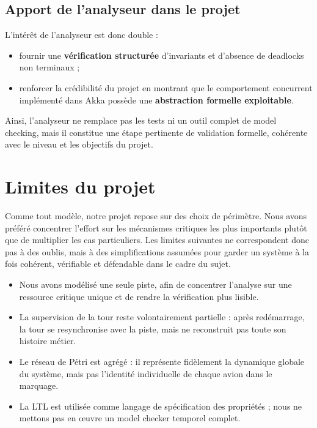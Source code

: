 \documentclass[11pt,a4paper]{article}
\begin{document}
\subsection{Apport de l'analyseur dans le projet}

L'intérêt de l'analyseur est donc double :
\begin{itemize}
    \item fournir une \textbf{vérification structurée} d'invariants et d'absence de deadlocks non terminaux ;
    \item renforcer la crédibilité du projet en montrant que le comportement concurrent implémenté dans Akka possède une \textbf{abstraction formelle exploitable}.
\end{itemize}

Ainsi, l'analyseur ne remplace pas les tests ni un outil complet de model checking, mais il constitue une étape pertinente de validation formelle, cohérente avec le niveau et les objectifs du projet.

\section{Limites du projet}

Comme tout modèle, notre projet repose sur des choix de périmètre. Nous avons préféré concentrer l'effort sur les mécanismes critiques les plus importants plutôt que de multiplier les cas particuliers. Les limites suivantes ne correspondent donc pas à des oublis, mais à des simplifications assumées pour garder un système à la fois cohérent, vérifiable et défendable dans le cadre du sujet.

\begin{itemize}
    \item Nous avons modélisé une seule piste, afin de concentrer l'analyse sur une ressource critique unique et de rendre la vérification plus lisible.
    \item La supervision de la tour reste volontairement partielle : après redémarrage, la tour se resynchronise avec la piste, mais ne reconstruit pas toute son histoire métier.
    \item Le réseau de Pétri est agrégé : il représente fidèlement la dynamique globale du système, mais pas l'identité individuelle de chaque avion dans le marquage.
    \item La LTL est utilisée comme langage de spécification des propriétés ; nous ne mettons pas en œuvre un model checker temporel complet.
\end{itemize}
\end{document}
